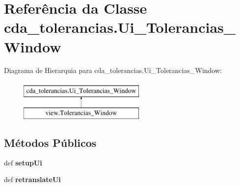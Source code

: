 \hypertarget{classcda__tolerancias_1_1Ui__Tolerancias__Window}{\section{\-Referência da \-Classe cda\-\_\-tolerancias.\-Ui\-\_\-\-Tolerancias\-\_\-\-Window}
\label{classcda__tolerancias_1_1Ui__Tolerancias__Window}
}
\-Diagrama de \-Hierarquia para cda\-\_\-tolerancias.\-Ui\-\_\-\-Tolerancias\-\_\-\-Window\-:\begin{figure}[H]
\begin{center}
\leavevmode
\includegraphics[height=2.000000cm]{classcda__tolerancias_1_1Ui__Tolerancias__Window}
\end{center}
\end{figure}
\subsection*{\-Métodos \-Públicos}
\begin{DoxyCompactItemize}
\item 
\hypertarget{classcda__tolerancias_1_1Ui__Tolerancias__Window_ab5ef73db8d33419fd978aa69e635b622}{def {\bfseries setup\-Ui}}\label{classcda__tolerancias_1_1Ui__Tolerancias__Window_ab5ef73db8d33419fd978aa69e635b622}

\item 
\hypertarget{classcda__tolerancias_1_1Ui__Tolerancias__Window_af813745c6b370834def98bd0757f9e5f}{def {\bfseries retranslate\-Ui}}\label{classcda__tolerancias_1_1Ui__Tolerancias__Window_af813745c6b370834def98bd0757f9e5f}

\end{DoxyCompactItemize}
